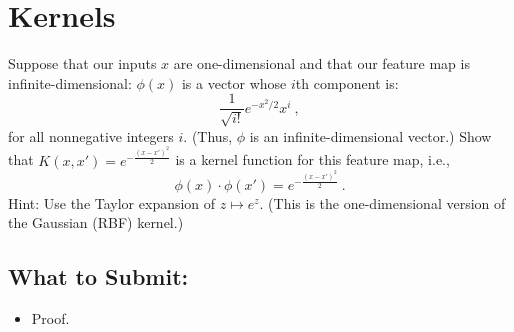 \documentclass{article}
\begin{document}
\section*{Kernels}
\begin{aprob}
     Suppose that our inputs $x$ are one-dimensional and that our feature map is infinite-dimensional:
    $\phi( x) $ is a vector whose $i$th component is:
    $$\frac{1}{\sqrt{i!}} e^{-x^2/2}x^i\ ,$$
    for all nonnegative integers $i$. (Thus, $\phi$ is an infinite-dimensional vector.)
    Show that $K(x, x') = e^{-\frac{(x-x')^2}{2}}$ is a kernel function for this feature map, i.e.,
    $$\phi (x) \cdot \phi (x') = e^{-\frac{(x-x')^2}{2}}\ .$$
    Hint: Use the Taylor expansion of $z \mapsto e^z$.
    (This is the one-dimensional version of the Gaussian (RBF) kernel.)
    \subsection*{What to Submit:}
    \begin{itemize}
        \item Proof.
    \end{itemize}
\end{aprob}
\end{document}
